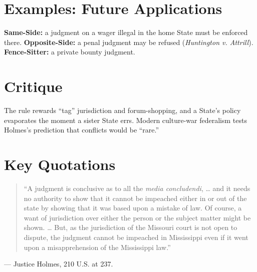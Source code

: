 \documentclass[12pt]{article}
\begin{document}
\section{Examples: Future Applications}
\textbf{Same-Side:} a judgment on a wager illegal in the home State must be enforced there. \textbf{Opposite-Side:} a penal judgment may be refused (\textit{Huntington v. Attrill}). \textbf{Fence-Sitter:} a private bounty judgment.

\section{Critique}
The rule rewards ``tag'' jurisdiction and forum-shopping, and a State's policy evaporates the moment a sister State errs. Modern culture-war federalism tests Holmes's prediction that conflicts would be ``rare.''

\section{Key Quotations}
\begin{quote}
``A judgment is conclusive as to all the \textit{media concludendi}, \ldots{} and it needs no authority to show that it cannot be impeached either in or out of the state by showing that it was based upon a mistake of law. Of course, a want of jurisdiction over either the person or the subject matter might be shown. \ldots{} But, as the jurisdiction of the Missouri court is not open to dispute, the judgment cannot be impeached in Mississippi even if it went upon a misapprehension of the Mississippi law.''
\end{quote}
\noindent --- Justice Holmes, 210 U.S. at 237.
\end{document}
